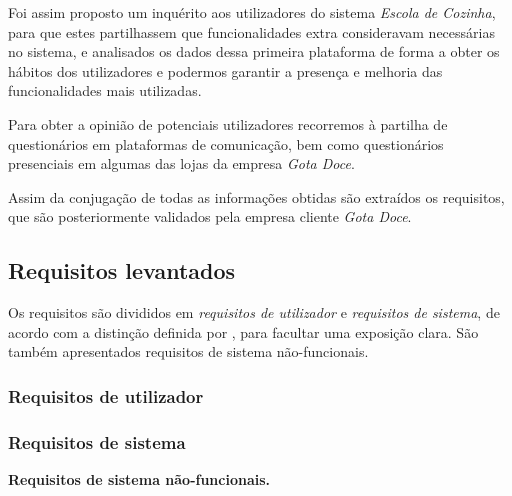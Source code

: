 Foi assim proposto um inquérito aos utilizadores do sistema \emph{Escola de Cozinha}, para que estes partilhassem que funcionalidades extra consideravam necessárias no sistema, e analisados os dados dessa primeira plataforma de forma a obter os hábitos dos utilizadores e podermos garantir a presença e melhoria das funcionalidades mais utilizadas.

Para obter a opinião de potenciais utilizadores recorremos à partilha de questionários em plataformas de comunicação, bem como questionários presenciais em algumas das lojas da empresa \emph{Gota Doce}.

Assim da conjugação de todas as informações obtidas são extraídos os requisitos, que são posteriormente validados pela empresa cliente \emph{Gota Doce}.


\subsection{Requisitos levantados}
\label{sec:requisitos:levantados}

Os requisitos são divididos em \emph{requisitos de utilizador} e \emph{requisitos de sistema}, de acordo com a distinção definida por \textcite[Capítulo~4]{sommerville2010software}, para facultar uma exposição clara. São também apresentados requisitos de sistema não-funcionais.




\subsubsection{Requisitos de utilizador}
\label{sec:requisitos:levantados:utilizador}

\onlyshowrequsrtrue
\setcounter{counterrequser}{0}



\subsubsection{Requisitos de sistema}
\label{sec:requisitos:levantados:sistema}

\onlyshowrequsrfalse
\setcounter{counterrequser}{0}


\textbf{Requisitos de sistema não-funcionais.}





